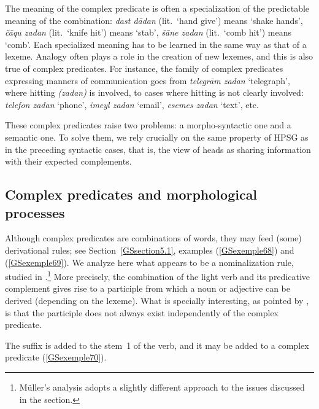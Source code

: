 The meaning of the complex predicate is often a specialization of the predictable meaning of the combination: \emph{dast d\=adan} (lit.\ `hand give') means `shake hands', \emph{\v c\=aqu zadan} (lit.\ `knife hit') means `stab', \emph{\v s\=ane zadan} (lit.\ `comb hit') means `comb'. Each specialized meaning has to be learned in the same way as that of a lexeme. Analogy often plays a role in the creation of new lexemes, and this is also true of complex predicates. For instance, the family of complex predicates expressing manners of communication goes from \emph{telegr\=am zadan} `telegraph', where hitting \emph{(zadan)} is involved, to cases where hitting is not clearly involved: \emph{telefon zadan} `phone’, \emph{imeyl zadan} `email', \emph{esemes zadan} `text', etc.   

These complex predicates raise two problems: a morpho-syntactic one and a semantic one. To solve them, we rely crucially on the same property of HPSG as in the preceding syntactic cases, that is, the view of heads as sharing information with their expected complements. 

\subsection{Complex predicates and morphological processes}\label{GSsection5.2}

Although  complex predicates are combinations of words, they may feed (some)
derivational rules; see Section~\ref{GSsection5.1}, examples (\ref{GSexemple68}) and
(\ref{GSexemple69}). We analyze here what appears to be a nominalization rule, studied in
.\footnote{Müller’s analysis adopts a slightly different approach to the
  issues discussed in the section.} More precisely, the combination of the light verb and its
predicative complement gives rise to a participle from which a noun or adjective can be derived (depending on the
lexeme). What is specially interesting, as pointed by \citet{MuellerPersian}, is that the participle
does not always exist independently of the complex predicate.

The suffix  is added to the stem~1 of the verb, and it may be added to a complex predicate (\ref{GSexemple70}).

\eal 
	\label{GSexemple70} 
    \label{GSexemple70a}
		
